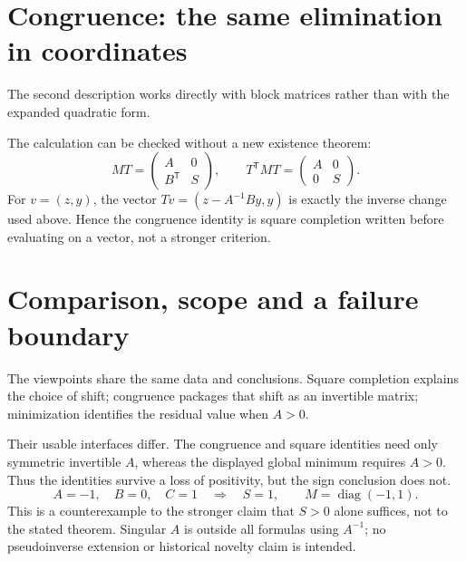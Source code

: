 \documentclass[12pt,reqno]{amsart}
\begin{document}
\section{Congruence: the same elimination in coordinates}
The second description works directly with block matrices rather than
with the expanded quadratic form.
\begin{proposition}\label{prop:comparison}

\end{proposition}
The calculation can be checked without a new existence theorem:
\[
 MT=\begin{pmatrix}A&0\\B^{\mathsf T}&S\end{pmatrix},\qquad
 T^{\mathsf T}MT=\begin{pmatrix}A&0\\0&S\end{pmatrix}.
\]
For $v=(z,y)$, the vector $Tv=(z-A^{-1}By,y)$ is exactly the inverse
change used above. Hence the congruence identity is square completion
written before evaluating on a vector, not a stronger criterion.

\section{Comparison, scope and a failure boundary}
The viewpoints share the same data and conclusions. Square completion
explains the choice of shift; congruence packages that shift as an invertible
matrix; minimization identifies the residual value when $A>0$.

Their usable interfaces differ. The congruence and square identities need
only symmetric invertible $A$, whereas the displayed global minimum requires
$A>0$. Thus the identities survive a loss of positivity, but the sign conclusion does not.
\[
 A=-1,\quad B=0,\quad C=1
 \quad\Longrightarrow\quad S=1,
 \qquad M=\operatorname{diag}(-1,1).
\]
This is a counterexample to the stronger claim that $S>0$ alone suffices,
not to the stated theorem. Singular $A$ is outside all formulas using $A^{-1}$;
no pseudoinverse extension or historical novelty claim is intended.

\nocite{S-guide}


\end{document}
